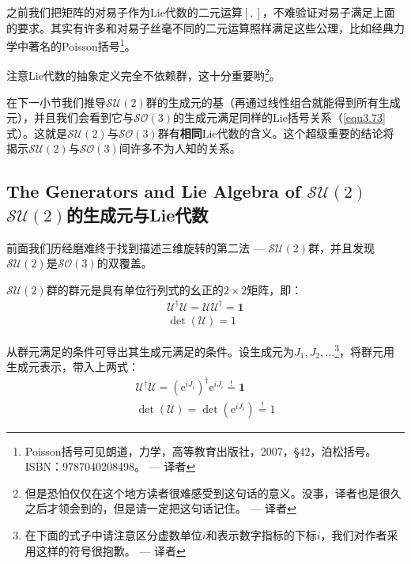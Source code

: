 之前我们把矩阵的对易子作为Lie代数的二元运算$[,]$，不难验证对易子满足上面的要求。其实有许多和对易子丝毫不同的二元运算照样满足这些公理，比如经典力学中著名的Poisson括号\footnote{Poisson括号可见朗道，力学，高等教育出版社，2007，\S42，泊松括号。ISBN：9787040208498。 --- 译者}。

注意Lie代数的抽象定义完全不依赖群，这十分重要哟\footnote{但是恐怕仅仅在这个地方读者很难感受到这句话的意义。没事，译者也是很久之后才领会到的，但是请一定把这句话记住。 --- 译者}。

在下一小节我们推导$\mathcal{SU}(2)$群的生成元的基（再通过线性组合就能得到所有生成元），并且我们会看到它与$\mathcal{SO}(3)$的生成元满足同样的Lie括号关系（\eqref{equ3.73}式）。这就是$\mathcal{SU}(2)$与$\mathcal{SO}(3)$群有{\bf 相同}Lie代数的含义。这个超级重要的结论将揭示$\mathcal{SU}(2)$与$\mathcal{SO}(3)$间许多不为人知的关系。



\subsection[$\mathcal{SU}(2)$的生成元与Lie代数]{The Generators and Lie Algebra of $\mathcal{SU}(2)$ \quad $\mathcal{SU}(2)$的生成元与Lie代数}
\label{sec3.4.3}
前面我们历经磨难终于找到描述三维旋转的第二法 --- $\mathcal{SU}(2)$群，并且发现$\mathcal{SU}(2)$是$\mathcal{SO}(3)$的双覆盖。

$\mathcal{SU}(2)$群的群元是具有单位行列式的幺正的$2 \times 2$矩阵，即：
\begin{align}
\label{equ3.75}
\mathcal{U}^\dag \mathcal{U} = \mathcal{U} \mathcal{U}^\dag = \mathbf{1} \\
\label{equ3.76}
\det (\mathcal{U}) = 1
\end{align}

从群元满足的条件可导出其生成元满足的条件。设生成元为$J_1, J_2, \dots$\footnote{在下面的式子中请注意区分虚数单位$i$和表示数字指标的下标$i$，我们对作者采用这样的符号很抱歉。 --- 译者}，将群元用生成元表示，带入上两式：
\begin{align}
\label{equ3.77}
\mathcal{U}^\dag \mathcal{U} = (\mathrm{e}^{iJ_i})^\dag \mathrm{e}^{iJ_i} \stackrel{!}{=} \mathbf{1} \\
\label{equ3.78}
\det (\mathcal{U}) = \det (\mathrm{e}^{iJ_i}) \stackrel{!}{=} 1
\end{align}

